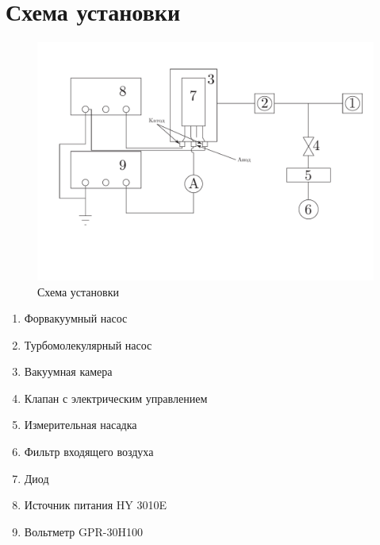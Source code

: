 \documentclass[a4paper, 12pt]{article}
\begin{document}
	\section{Схема установки}
	\begin{figure}[h]
		\centering
		\includegraphics[scale=0.4]{scheme.pdf}
		\caption{Схема установки}
		\label{fig:schematic}
	\end{figure}
	\begin{enumerate}
		\item Форвакуумный насос
		\item Турбомолекулярный насос
		\item Вакуумная камера
		\item Клапан с электрическим управлением
		\item Измерительная насадка
		\item Фильтр входящего воздуха
		\item Диод
		\item Источник питания HY 3010E
		\item Вольтметр GPR-30H100
	\end{enumerate}
\end{document}
